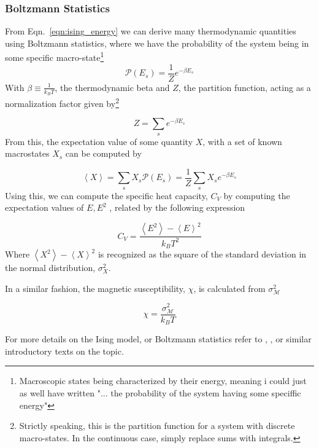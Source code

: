 \documentclass[10pt,showpacs,preprintnumbers,amsmath,amssymb,nofootinbib,aps,prl,twocolumn,groupedaddress,superscriptaddress,showkeys]{revtex4-1}
\begin{document}
    \subsubsection{Boltzmann Statistics}
      From Eqn.~\ref{eqn:ising_energy} we can derive many thermodynamic quantities using Boltzmann statistics, where we have the probability of the system being in some specific macro-state\footnote{Macroscopic states being characterized by their energy, meaning i could just as well have written "... the probability of the system having some speciffic energy"}
      \begin{equation}
        \mathcal P(E_s) = \frac{1}{Z} e^{-\beta E_s}
      \end{equation}
      With $\beta \equiv \frac{1}{k_B T}$, the thermodynamic beta and $Z$, the partition function, acting as a normalization factor given by\footnote{Strictly speaking, this is the partition function for a system with discrete macro-states. In the continuous case, simply replace sums with integrals.}

      \begin{equation}
        Z = \sum_s e^{-\beta E_s}
      \end{equation}
      From this, the expectation value of some quantity $X$, with a set of known macrostates $X_s$ can be computed by

      \begin{equation}
        \left<X\right> = \sum_s X_s \mathcal P(E_s) = \frac{1}{Z} \sum_s X_s e^{-\beta E_s} 
      \end{equation}
      Using this, we can compute the specific heat capacity, $C_V$ by computing the expectation values of $E, E^2$ \cite{statmek_lecnotes}, related by the following expression

      \begin{equation}
        C_V = \frac{\left<E^2\right> - \left<E\right>^2}{k_B T^2}
      \end{equation}
      Where $\left<X^2\right> - \left<X\right>^2$ is recognized as the square of the standard deviation in the normal distribution, $\sigma_X^2$.

      In a similar fashion, the magnetic susceptibility, $\chi$, is calculated from $\sigma_\mathcal M ^2$ \cite{statmek_lecnotes}

      \begin{equation}
        \chi = \frac{\sigma^2_\mathcal M}{k_B T}
      \end{equation}

      For more details on the Ising model, or Boltzmann statistics refer to \textcite[Chapters~6, 8.2]{schroeder}, \textcite{statmek_lecnotes}, or similar introductory texts on the topic.
\end{document}
